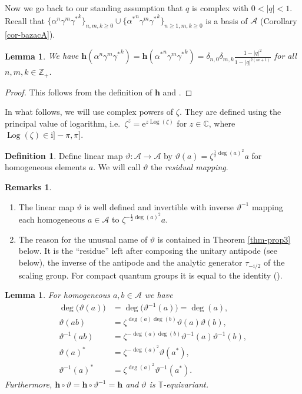 \documentclass[12pt,reqno,a4paper]{amsart}
\newtheorem{lemma}[proposition]{Lemma}
\theoremstyle{definition}
\newtheorem{definition}[proposition]{Definition}
\newtheorem{remarks}[proposition]{Remarks}
\newcommand{\comp}{\circ}
\newcommand{\ee}{\mathrm{e}}
\newcommand{\ii}{\mathrm{i}}
\newcommand{\CC}{\mathbb{C}}
\newcommand{\TT}{\mathbb{T}}
\newcommand{\ZZ}{\mathbb{Z}}
\newcommand{\cA}{\mathscr{A}}
\newcommand{\bh}{{\boldsymbol{h}}}
\numberwithin{equation}{section}
\begin{document}
Now we go back to our standing assumption that $q$ is complex with $0<|q|<1$. Recall that $\{\alpha^n\gamma^m{\gamma^*}^k\}_{n,m,k\ge 0}\cup\{{\alpha^*}^n\gamma^m{\gamma^*}^k\}_{n\ge 1,m,k\ge 0}$ is a basis of $\cA$ (Corollary \ref{cor-bazacA}).

\begin{lemma}
We have $\bh(\alpha^n\gamma^m{\gamma^*}^k)=
\bh({\alpha^*}^n\gamma^m{\gamma^*}^k)
=\delta_{n,0}\delta_{m,k}\tfrac{1-|q|^2}{1-|q|^{2(m+1)}}$ for all $n,m,k\in\ZZ_+$.
\end{lemma}

\begin{proof}
This follows from the definition of $\bh$ and \cite[Theorem 4.1]{ZhangZhao}.
\end{proof}

In what follows, we will use complex powers of $\zeta$. They are defined using the principal value of logarithm, i.e.~$\zeta^z=\ee^{z \operatorname{Log}(\zeta)}$ for $z\in\CC$, where $\operatorname{Log}(\zeta)\in\ii]-\pi,\pi]$.

\begin{definition}
Define linear map $\vartheta\colon\cA\to\cA$ by $\vartheta(a)=\zeta^{\frac{1}{2}\deg(a)^2}a$ for homogeneous elements $a$. We will call $\vartheta$ the \emph{residual mapping}.
\end{definition}

\begin{remarks}\hspace*{\fill}
\begin{enumerate}
\item The linear map $\vartheta$ is well defined and invertible with inverse $\vartheta^{-1}$ mapping each homogeneous $a\in\cA$ to $\zeta^{-\frac{1}{2} \deg(a)^2}a$.
\item The reason for the unusual name of $\vartheta$ is contained in Theorem \ref{thm-prop3} below. It is the ``residue'' left after composing the unitary antipode (see below), the inverse of the antipode and the analytic generator $\tau_{-\ii/2}$ of the scaling group. For compact quantum groups it is equal to the identity (\cite[Theorem 2.6(4)]{CQGs}).
\end{enumerate}
\end{remarks}

\begin{lemma}\label{lem-lemma18}
For homogeneous $a,b\in\cA$ we have
\begin{align*}
\deg\bigl(\vartheta(a)\bigr)&=\deg\bigl(\vartheta^{-1}(a)\bigr)=\deg(a),\\
\vartheta(ab)&=\zeta^{\deg(a)\deg(b)}\vartheta(a)\vartheta(b),\\
\vartheta^{-1}(ab)&=\zeta^{-\deg(a)\deg(b)}\vartheta^{-1}(a)\vartheta^{-1}(b),\\
\vartheta(a)^*&=\zeta^{-\deg(a)^2}\vartheta(a^*),\\
\vartheta^{-1}(a)^*&=\zeta^{\deg(a)^2}\vartheta^{-1}(a^*).
\end{align*}
Furthermore, $\bh\comp\vartheta=\bh\comp\vartheta^{-1}=\bh$ and $\vartheta$ is $\TT$-equivariant.
\end{lemma}
\end{document}
